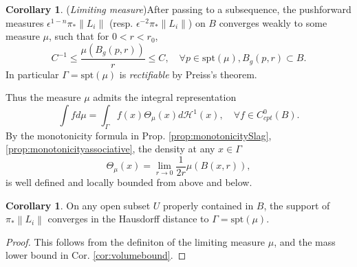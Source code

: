 \documentclass{article}
\theoremstyle{definition}
\newtheorem{cor}[thm]{Corollary}
\newcommand{\norm}[1]{\left\lVert#1\right\rVert}
\begin{document}
				
				\begin{cor}(\emph{Limiting measure})\label{cor:limitingmeasure}
			After passing to a subsequence,  the pushforward measures $\epsilon^{1-n}\pi_* \norm{L_i}$ (resp. $\epsilon^{-2} \pi_* \norm{L_i} $) on $B$ converges weakly to some measure $\mu$, such that for $0< r<r_0$, 
					\begin{equation}
						C^{-1} \leq \frac{ \mu(B_g(p,r))}{ r } \leq C,\quad \forall p\in \text{spt}(\mu), B_g(p,r)\subset B.
					\end{equation}
					In particular $\Gamma= \text{spt}(\mu)$ is \emph{rectifiable} by Preiss's theorem.
					
				\end{cor}		
				
				
				
			Thus the measure $\mu$ admits the integral representation
			\begin{equation}
				\int f d\mu= \int_\Gamma f (x) \Theta_\mu(x) d\mathcal{H}^1(x), \quad \forall f\in C^0_{cpt}(B).
				\end{equation}
				By the monotonicity formula in Prop. \ref{prop:monotonicitySlag}, \ref{prop:monotonicityassociative}, the density at any $x\in \Gamma$
				\[
				\Theta_\mu(x)= \lim_{r\to 0} \frac{1}{2r} \mu( B(x,r) ) ,
				\]
				is well defined and locally bounded from above and below.
				
				
				
				\begin{cor}\label{cor:Hausdorffdist}
				On any open subset $U$ properly contained in $B$, the support of $\pi_* \norm{L_i}$ converges in the Hausdorff distance to $\Gamma= \text{spt}(\mu)$.
				\end{cor}
				
				
				
				
				\begin{proof}
				This follows from the definiton of the limiting measure $\mu$, and the mass lower bound in Cor. \ref{cor:volumebound}.
				\end{proof}
				
				
				
\end{document}
